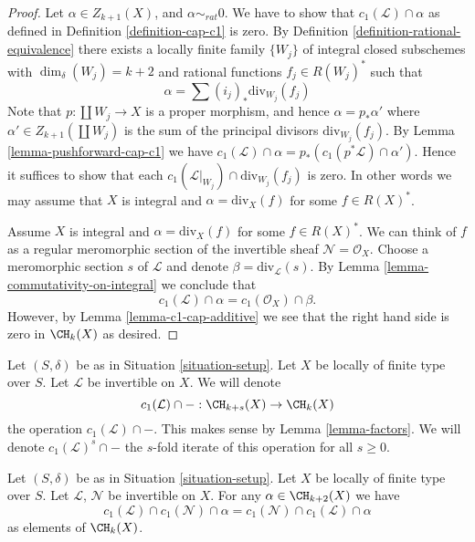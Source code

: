 \begin{proof}
Let $\alpha \in Z_{k + 1}(X)$, and $\alpha \sim_{rat} 0$.
We have to show that $c_1(\mathcal{L}) \cap \alpha$
as defined in Definition \ref{definition-cap-c1} is zero.
By Definition \ref{definition-rational-equivalence} there
exists a locally finite family $\{W_j\}$ of integral closed
subschemes with $\dim_\delta(W_j) = k + 2$ and rational functions
$f_j \in R(W_j)^*$ such that
$$
\alpha = \sum (i_j)_*\text{div}_{W_j}(f_j)
$$
Note that $p : \coprod W_j \to X$ is a proper morphism,
and hence $\alpha = p_*\alpha'$ where $\alpha' \in Z_{k + 1}(\coprod W_j)$
is the sum of the principal divisors $\text{div}_{W_j}(f_j)$.
By Lemma \ref{lemma-pushforward-cap-c1} we have
$c_1(\mathcal{L}) \cap \alpha = p_*(c_1(p^*\mathcal{L}) \cap \alpha')$.
Hence it suffices to show that each
$c_1(\mathcal{L}|_{W_j}) \cap \text{div}_{W_j}(f_j)$ is zero.
In other words we may assume that $X$ is integral and
$\alpha = \text{div}_X(f)$ for some $f \in R(X)^*$.

\medskip\noindent
Assume $X$ is integral and $\alpha = \text{div}_X(f)$ for some $f \in R(X)^*$.
We can think of $f$ as a regular meromorphic section of the invertible
sheaf $\mathcal{N} = \mathcal{O}_X$. Choose a meromorphic section
$s$ of $\mathcal{L}$ and denote $\beta = \text{div}_\mathcal{L}(s)$.
By Lemma \ref{lemma-commutativity-on-integral}
we conclude that
$$
c_1(\mathcal{L}) \cap \alpha = c_1(\mathcal{O}_X) \cap \beta.
$$
However, by Lemma \ref{lemma-c1-cap-additive} we see that the right hand side
is zero in $\CH_k(X)$ as desired.
\end{proof}

\noindent
Let $(S, \delta)$ be as in Situation \ref{situation-setup}.
Let $X$ be locally of finite type over $S$.
Let $\mathcal{L}$ be invertible on $X$.
We will denote
$$
c_1(\mathcal{L}) \cap - : \CH_{k + s}(X) \to \CH_k(X)
$$
the operation $c_1(\mathcal{L}) \cap - $. This makes sense by
Lemma \ref{lemma-factors}. We will denote $c_1(\mathcal{L})^s \cap -$
the $s$-fold iterate of this operation for all $s \geq 0$.

\begin{lemma}
\label{lemma-cap-commutative}
Let $(S, \delta)$ be as in Situation \ref{situation-setup}.
Let $X$ be locally of finite type over $S$.
Let $\mathcal{L}$, $\mathcal{N}$ be invertible on $X$.
For any $\alpha \in \CH_{k + 2}(X)$ we have
$$
c_1(\mathcal{L}) \cap c_1(\mathcal{N}) \cap \alpha
=
c_1(\mathcal{N}) \cap c_1(\mathcal{L}) \cap \alpha
$$
as elements of $\CH_k(X)$.
\end{lemma}

